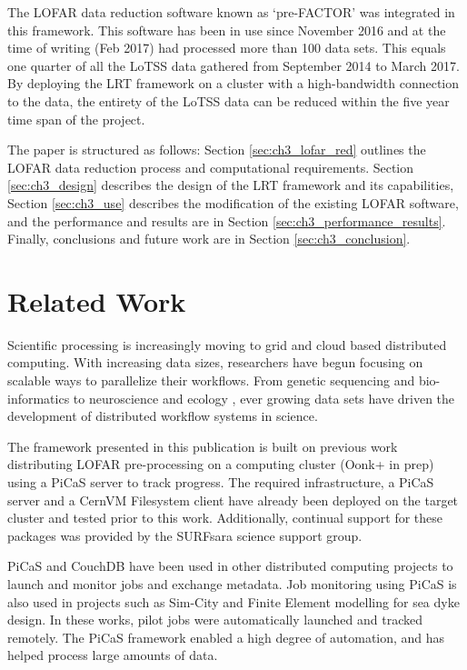 The LOFAR data reduction software known as `pre-FACTOR'\cite{prefactor} was integrated in this framework. This software has been in use since November 2016 and at the time of writing (Feb 2017) had processed more than 100 data sets. This equals one quarter of all the LoTSS data gathered from September 2014 to March 2017. By deploying the LRT framework on a cluster with a high-bandwidth connection to the data, the entirety of the LoTSS data can be reduced within the five year time span of the project. 

The paper is structured as follows: Section \ref{sec:ch3_lofar_red} outlines the LOFAR data reduction process and computational requirements. Section \ref{sec:ch3_design} describes the design of the LRT framework and its capabilities, Section \ref{sec:ch3_use} describes the modification of the existing LOFAR software, and the performance and results are in Section \ref{sec:ch3_performance_results}. Finally, conclusions  and future work are in Section \ref{sec:ch3_conclusion}.

\section{Related Work}

Scientific processing is increasingly moving to grid and cloud based distributed computing. With increasing data sizes, researchers have begun focusing on scalable ways to parallelize their workflows. From genetic sequencing \cite{scalable} and bio-informatics\cite{bioinfo} to neuroscience\cite{neurogrid} and ecology \cite{ecoinfo}, ever growing data sets have driven the development of distributed workflow systems in science\cite{pegasus}\cite{swift}. 

The framework presented in this publication is built on previous work distributing LOFAR pre-processing on a computing cluster (Oonk+ in prep) using a PiCaS server to track progress\cite{picas}. The required infrastructure, a PiCaS\cite{picas} server and a CernVM Filesystem client\cite{cvmfs2008} have already been deployed on the target cluster and tested prior to this work. Additionally, continual support for these packages was provided by the SURFsara science support group. 

PiCaS\cite{picas_git} and CouchDB\cite{couchdb} have been used in other distributed computing projects to launch and monitor jobs and exchange metadata. Job monitoring using PiCaS is also used in projects such as Sim-City\cite{simcity} and Finite Element modelling for sea dyke design\cite{li2017reliability}. In these works, pilot jobs were automatically launched and tracked remotely. The PiCaS framework enabled a high degree of automation, and has helped process large amounts of data.  

